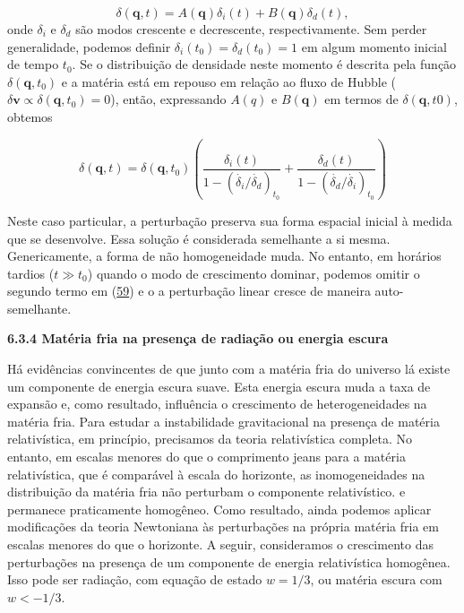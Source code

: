 \documentclass[a4paper,12pt]{article}
\begin{document}
\begin{equation}\label{eq59}
	\delta (\mathbf{q},t ) = A(\mathbf{q}) \delta_i (t)+B(\mathbf{q})\delta_d (t),
\end{equation}
onde $\delta_i$ e $\delta_d$ são modos crescente e decrescente, respectivamente. Sem perder
generalidade, podemos definir $\delta_i (t_0) = \delta_d (t_0) = 1$ em algum momento inicial de tempo $t_0$. Se o
distribuição de densidade neste momento é descrita pela função $\delta(\mathbf{q}, t_0)$ e a matéria
está em repouso em relação ao fluxo de Hubble ($\delta\mathbf{v} \propto \delta (\mathbf{q}, t_0) = 0$), então, expressando $A (q)$
e $B (\mathbf{q})$ em termos de $\delta (\mathbf{q}, t0)$, obtemos

\begin{equation}\label{eq60}
	\delta (\mathbf{q},t) = \delta (\mathbf{q}, t_0)\left( \dfrac{\delta_i(t)}{1 - (\dot{\delta_i}/\dot{\delta_d})_{t_0}} + \dfrac{\delta_d(t)}{1 - (\dot{\delta_d}/\dot{\delta_i})_{t_0}}\right)
\end{equation}

Neste caso particular, a perturbação preserva sua forma espacial inicial à medida que se desenvolve. Essa solução é considerada semelhante a si mesma.
Genericamente, a forma de não homogeneidade muda. No entanto, em horários tardios ($t \gg t_0$)
quando o modo de crescimento dominar, podemos omitir o segundo termo em (\hyperref[eq59]{59}) e o
a perturbação linear cresce de maneira auto-semelhante.
\newline

\begin{center}
	\textbf{6.3.4 Matéria fria na presença de radiação ou energia escura}
\end{center}

Há evidências convincentes de que junto com a matéria fria do universo lá
existe um componente de energia escura suave. Esta energia escura muda a taxa de expansão e, como resultado, influência o crescimento de heterogeneidades na matéria fria.
Para estudar a instabilidade gravitacional na presença de matéria relativística, em princípio, precisamos da teoria relativística completa. No entanto, em escalas menores do que o comprimento jeans
para a matéria relativística, que é comparável à escala do horizonte, as inomogeneidades na distribuição da matéria fria não perturbam o componente relativístico.
e permanece praticamente homogêneo. Como resultado, ainda podemos aplicar modificações da
teoria Newtoniana às perturbações na própria matéria fria em escalas menores
do que o horizonte. A seguir, consideramos o crescimento das perturbações na
presença de um componente de energia relativística homogênea. Isso pode ser radiação,
com equação de estado $w = 1/3$, ou matéria escura com $w < - 1/3$.
\end{document}

